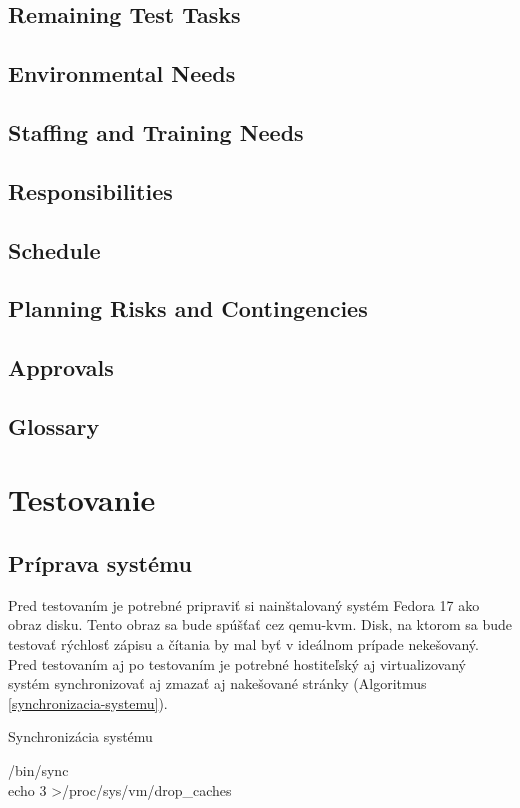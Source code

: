 \section{Remaining Test Tasks}
\section{Environmental Needs}
\section{Staffing and Training Needs}
\section{Responsibilities}
\section{Schedule}
\section{Planning Risks and Contingencies}
\section{Approvals}
\section{Glossary}

%
%

\chapter{Testovanie}

\section{Príprava systému}

Pred testovaním je potrebné pripraviť si nainštalovaný systém Fedora 17 ako
obraz disku. Tento obraz sa bude spúšťať cez qemu-kvm. Disk, na ktorom sa bude
testovať rýchlosť zápisu a čítania by mal byť v ideálnom prípade nekešovaný.
Pred testovaním aj po testovaním je potrebné hostiteľský aj virtualizovaný
systém synchronizovať aj zmazať aj nakešované stránky (Algoritmus
\ref{synchronizacia-systemu}).

\begin{algorithm}
    \caption{Synchronizácia systému\label{synchronizacia-systemu}}
    /bin/sync\\
    echo 3 \textgreater /proc/sys/vm/drop\_caches
\end{algorithm}

